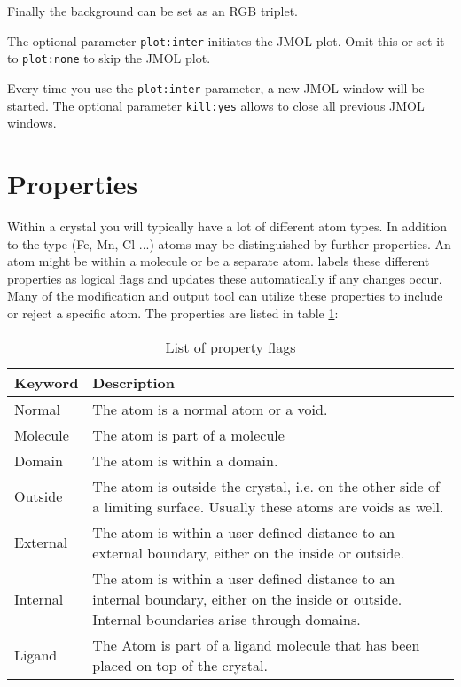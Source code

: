 Finally the background can be set as an RGB triplet.

The optional parameter {\tt plot:inter} initiates the JMOL plot. Omit this 
or set it to {\tt plot:none} to skip the JMOL plot. 

Every time you use the {\tt plot:inter} parameter, a new JMOL window 
will be started. The optional parameter {\tt kill:yes} allows to
close all previous JMOL windows.


\section{Properties \label{struc-properties}}

Within a crystal you will typically have a lot of different atom types. 
In addition to the type (Fe, Mn, Cl ...) atoms may be distinguished by
further properties. An atom might be within a molecule or be a separate
atom. \Discus labels these different properties as logical flags 
and updates these 
automatically if any changes occur. Many of the modification and output
tool can utilize these properties to include or reject a specific atom.
The properties are listed in table \ref{struc-prp-tab}:

\begin{table}[!tbh]
\centering
\begin{tabularx}{\textwidth}{|p{25mm}|X|}
  \hline
  {\bf Keyword} & {\bf Description} \\
  \hline\hline
  Normal      & The atom is a normal atom or a void.\\
  \hline
  Molecule    & The atom is part of a molecule \\
  \hline
  Domain      & The atom is within a domain. \\
  \hline
  Outside     & The atom is outside the crystal, i.e. on the other
                side of a limiting surface. Usually these atoms are
                voids as well.\\
  \hline
  External    & The atom is within a user defined distance to an 
                external boundary, either on the inside or outside.\\
  \hline
  Internal    & The atom is within a user defined distance to an 
                internal boundary, either on the inside or outside.
                Internal boundaries arise through domains.\\
  \hline
  Ligand      & The Atom is part of a ligand molecule that has been 
                placed on top of the crystal.\\
  \hline
\end{tabularx}
\caption{\label{struc-prp-tab} List of property flags}
\end{table}

